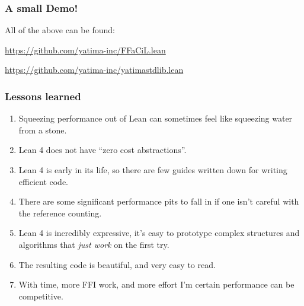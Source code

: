 \documentclass[options]{beamer}
\begin{document}
\begin{frame}
    \frametitle{A small Demo!}

    All of the above can be found:

    \vspace{30pt}

    \url{https://github.com/yatima-inc/FFaCiL.lean}
    \vspace{20pt}

    \url{https://github.com/yatima-inc/yatimastdlib.lean}


\end{frame}
\begin{frame}
    \frametitle{Lessons learned}

    \begin{enumerate}
        \item Squeezing performance out of Lean can sometimes feel like squeezing water from a stone.
        \item Lean 4 does not have ``zero cost abstractions''. 
        \item Lean 4 is early in its life, so there are few guides written down for writing efficient code.
        \item There are some significant performance pits to fall in if one isn't careful with the reference counting.
        \pause
        \vspace{10pt}
        \item Lean 4 is incredibly expressive, it's easy to prototype complex structures and algorithms that \emph{just work} on the first try.
        \item The resulting code is beautiful, and very easy to read.
        \item With time, more FFI work, and more effort I'm certain performance can be competitive.
    \end{enumerate}

\end{frame}
\end{document}
